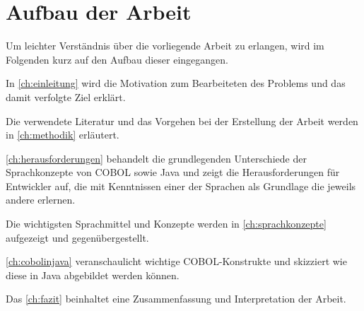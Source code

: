 \section{Aufbau der Arbeit}
Um leichter Verständnis über die vorliegende Arbeit zu erlangen, wird im Folgenden kurz auf den Aufbau dieser eingegangen.

In \autoref{ch:einleitung} wird die Motivation zum Bearbeiteten des Problems und das damit verfolgte Ziel erklärt. 

Die verwendete Literatur und das Vorgehen bei der Erstellung der Arbeit werden in \autoref{ch:methodik} erläutert.

\autoref{ch:herausforderungen} behandelt die grundlegenden Unterschiede der Sprachkonzepte von COBOL sowie Java und zeigt die Herausforderungen für Entwickler auf, die mit Kenntnissen einer der Sprachen als Grundlage die jeweils andere erlernen.

Die wichtigsten Sprachmittel und Konzepte werden in \autoref{ch:sprachkonzepte} aufgezeigt und gegenübergestellt.

\autoref{ch:cobolinjava} veranschaulicht wichtige COBOL-Konstrukte und skizziert wie diese in Java abgebildet werden können.

Das \autoref{ch:fazit} beinhaltet eine Zusammenfassung und Interpretation der Arbeit.
